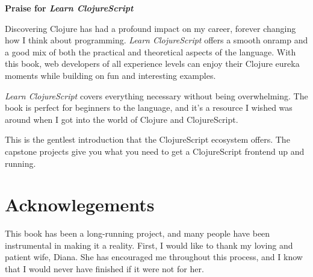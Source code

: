 \documentclass[10pt,twoside,openright]{memoir}
\begin{document}
\thispagestyle{empty}%
\begin{flushright}
\normalfont
{\Large\textbf{\textsf{Praise for \emph{Learn ClojureScript}}}\par}%
\hrulefill\par
\vskip 2cm

\begin{fquote}Discovering Clojure has had a profound impact on my career, forever changing how I think about programming. \emph{Learn ClojureScript} offers a smooth onramp and a good mix of both the practical and theoretical aspects of the language. With this book, web developers of all experience levels can enjoy their Clojure eureka moments while building on fun and interesting examples.
\end{fquote}

\begin{fquote}\emph{Learn ClojureScript} covers everything necessary without being overwhelming. The book is perfect for beginners to the language, and it's a resource I wished was around when I got into the world of Clojure and ClojureScript.
\end{fquote}

\begin{fquote}This is the gentlest introduction that the ClojureScript ecosystem offers. The capstone projects give you what you need to get a ClojureScript frontend up and running.
\end{fquote}


\end{flushright}
\vfill

\cleardoublepage

\tableofcontents

\cleardoublepage


\section{Acknowlegements}

This book has been a long-running project, and many people have been instrumental in making it a reality. First, I would like to thank my loving and patient wife, Diana. She has encouraged me throughout this process, and I know that I would never have finished if it were not for her.
\end{document}
